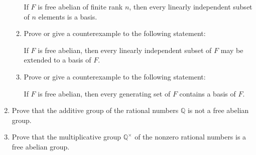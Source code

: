 \documentclass[12pt]{article}
\newcommand{\QQ}{{\mathbb Q}}
\begin{document}
\begin{enumerate}
\begin{enumerate}
    If  $F$ is free abelian of finite rank $n$, then  every
    linearly independent subset of $n$ elements is a basis.
    
  \item 
    Prove or give a counterexample to the following statement:

     If $F$ is free abelian, then  every
     linearly independent subset of $F$ may be extended to a basis of $F$.
     
  \item 
    Prove or give a counterexample to the following statement:

     If $F$ is free abelian, then every generating set
    of $F$ contains a basis of $F$.

 \end{enumerate}

% 
\item   Prove that the additive group of the rational numbers $\QQ$ is not a free abelian group.


\item     Prove that the multiplicative group $\QQ^\times$  of the nonzero rational numbers is a free abelian group.  



\end{enumerate}
\end{document}

